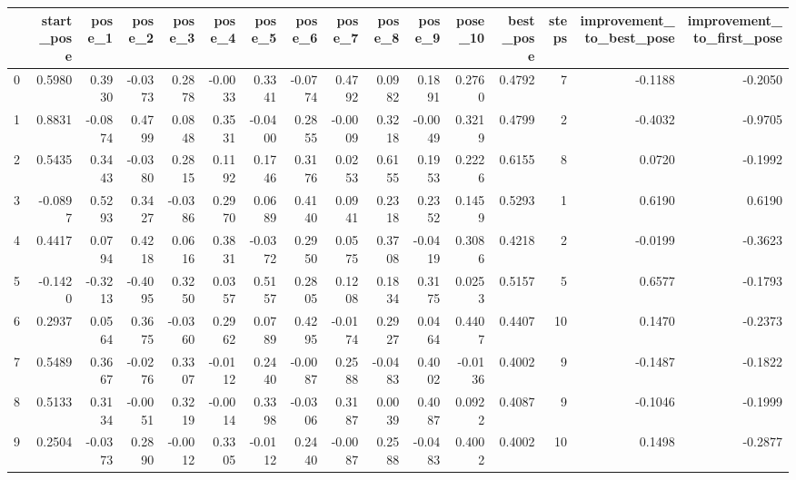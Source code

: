 \begin{tabular}{lrrrrrrrrrrrrrrr}
\toprule
{} &  start\_pose &  pose\_1 &  pose\_2 &  pose\_3 &  pose\_4 &  pose\_5 &  pose\_6 &  pose\_7 &  pose\_8 &  pose\_9 &  pose\_10 &  best\_pose &  steps &  improvement\_to\_best\_pose &  improvement\_to\_first\_pose \\
\midrule
0  &      0.5980 &  0.3930 & -0.0373 &  0.2878 & -0.0033 &  0.3341 & -0.0774 &  0.4792 &  0.0982 &  0.1891 &   0.2760 &     0.4792 &      7 &                   -0.1188 &                    -0.2050 \\
1  &      0.8831 & -0.0874 &  0.4799 &  0.0848 &  0.3531 & -0.0400 &  0.2855 & -0.0009 &  0.3218 & -0.0049 &   0.3219 &     0.4799 &      2 &                   -0.4032 &                    -0.9705 \\
2  &      0.5435 &  0.3443 & -0.0380 &  0.2815 &  0.1192 &  0.1746 &  0.3176 &  0.0253 &  0.6155 &  0.1953 &   0.2226 &     0.6155 &      8 &                    0.0720 &                    -0.1992 \\
3  &     -0.0897 &  0.5293 &  0.3427 & -0.0386 &  0.2970 &  0.0689 &  0.4140 &  0.0941 &  0.2318 &  0.2352 &   0.1459 &     0.5293 &      1 &                    0.6190 &                     0.6190 \\
4  &      0.4417 &  0.0794 &  0.4218 &  0.0616 &  0.3831 & -0.0372 &  0.2950 &  0.0575 &  0.3708 & -0.0419 &   0.3086 &     0.4218 &      2 &                   -0.0199 &                    -0.3623 \\
5  &     -0.1420 & -0.3213 & -0.4095 &  0.3250 &  0.0357 &  0.5157 &  0.2805 &  0.1208 &  0.1834 &  0.3175 &   0.0253 &     0.5157 &      5 &                    0.6577 &                    -0.1793 \\
6  &      0.2937 &  0.0564 &  0.3675 & -0.0360 &  0.2962 &  0.0789 &  0.4295 & -0.0174 &  0.2927 &  0.0464 &   0.4407 &     0.4407 &     10 &                    0.1470 &                    -0.2373 \\
7  &      0.5489 &  0.3667 & -0.0276 &  0.3307 & -0.0112 &  0.2440 & -0.0087 &  0.2588 & -0.0483 &  0.4002 &  -0.0136 &     0.4002 &      9 &                   -0.1487 &                    -0.1822 \\
8  &      0.5133 &  0.3134 & -0.0051 &  0.3219 & -0.0014 &  0.3398 & -0.0306 &  0.3187 &  0.0039 &  0.4087 &   0.0922 &     0.4087 &      9 &                   -0.1046 &                    -0.1999 \\
9  &      0.2504 & -0.0373 &  0.2890 & -0.0012 &  0.3305 & -0.0112 &  0.2440 & -0.0087 &  0.2588 & -0.0483 &   0.4002 &     0.4002 &     10 &                    0.1498 &                    -0.2877 \\

\end{tabular}
